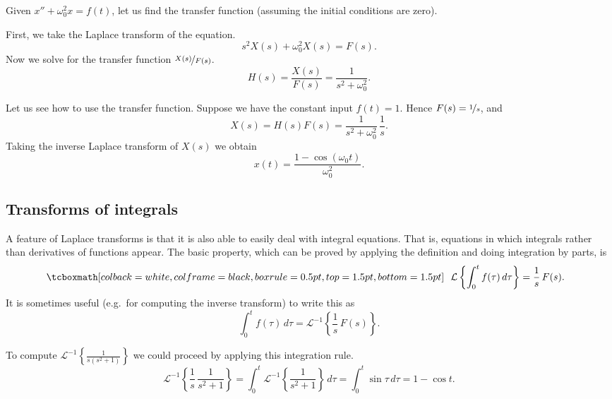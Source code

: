 \begin{example}
Given $x'' + \omega_0^2 x = f(t)$, let us find the transfer function
(assuming the initial conditions are zero).

First, we take the Laplace transform of the equation.
\begin{equation*}
s^2 X(s) + \omega_0^2 X(s) = F(s) .
\end{equation*}
Now we solve for the transfer function $\nicefrac{X(s)}{F(s)}$.
\begin{equation*}
H(s) = \frac{X(s)}{F(s)} = \frac{1}{s^2 + \omega_0^2} .
\end{equation*}

Let us see how to use the transfer function.  Suppose we have the constant input
$f(t) = 1$.  Hence $F(s) = \nicefrac{1}{s}$, and
\begin{equation*}
X(s) = H(s) F(s) = \frac{1}{s^2+\omega_0^2} \, \frac{1}{s} .
\end{equation*}
Taking the inverse Laplace transform of $X(s)$ we obtain
\begin{equation*}
x(t) = \frac{1-\cos(\omega_0 t)}{\omega_0^2} .
\end{equation*}
\end{example}

\subsection{Transforms of integrals}

A feature of Laplace transforms is that it is also able to easily deal
with integral equations.  That is, equations in which integrals rather than
derivatives of functions appear.  The basic property, which can be proved
by applying the definition and doing integration by parts, is 
\begin{equation*}
\mybxbg{~~
\mathcal{L} \left\{
\int_0^t f(\tau) \, d\tau
\right\} = \frac{1}{s} \, F(s) .
~~}
\end{equation*}
It is sometimes useful (e.g.\ for computing the inverse transform) to write
this as
\begin{equation*}
\int_0^t f(\tau) \, d\tau
=
{\mathcal{L}}^{-1} \left\{
\frac{1}{s} \, F(s) \right\} .
\end{equation*}

\begin{example}
To compute ${\mathcal{L}}^{-1} \left\{\frac{1}{s(s^2+1)}\right\}$ we could
proceed by applying this integration rule.  
\begin{equation*}
{\mathcal{L}}^{-1} \left\{
\frac{1}{s} \, \frac{1}{s^2+1} \right\} 
=
\int_0^t 
{\mathcal{L}}^{-1} \left\{
\frac{1}{s^2+1} \right\} \, d\tau
=
\int_0^t 
\sin \tau \, d\tau
=
1 - \cos t .
\end{equation*}
\end{example}


